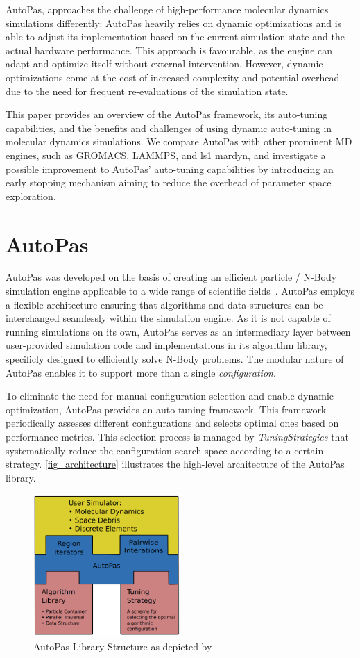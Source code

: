 \documentclass[conference]{IEEEtran}
\begin{document}
AutoPas, approaches the challenge of high-performance molecular dynamics simulations differently: AutoPas heavily relies on dynamic optimizations and is able to adjust its implementation based on the current simulation state and the actual hardware performance. This approach is favourable, as the engine can adapt and optimize itself without external intervention. However, dynamic optimizations come at the cost of increased complexity and potential overhead due to the need for frequent re-evaluations of the simulation state.

This paper provides an overview of the AutoPas framework, its auto-tuning capabilities, and the benefits and challenges of using dynamic auto-tuning in molecular dynamics simulations. We compare AutoPas with other prominent MD engines, such as GROMACS, LAMMPS, and ls1 mardyn, and investigate a possible improvement to AutoPas' auto-tuning capabilities by introducing an early stopping mechanism aiming to reduce the overhead of parameter space exploration.

\section{AutoPas}

AutoPas was developed on the basis of creating an efficient particle / N-Body simulation engine applicable to a wide range of scientific fields~\cite{Tchipev2020}. AutoPas employs a flexible architecture ensuring that algorithms and data structures can be interchanged seamlessly within the simulation engine. As it is not capable of running simulations on its own, AutoPas serves as an intermediary layer between user-provided simulation code and implementations in its algorithm library, specificly designed to efficiently solve N-Body problems. The modular nature of AutoPas enables it to support more than a single \textit{configuration}.

To eliminate the need for manual configuration selection and enable dynamic optimization, AutoPas provides an auto-tuning framework. This framework periodically assesses different configurations and selects optimal ones based on performance metrics. This selection process is managed by \textit{TuningStrategies} that systematically reduce the configuration search space according to a certain strategy. \autoref{fig_architecture} illustrates the high-level architecture of the AutoPas library.

\begin{figure}[H]
    \centering
    \includegraphics[width=2.2in]{figures/AutoPasLibraryStructure.png}
    \caption{AutoPas Library Structure as depicted by~\cite{Newcome2023Poster}}
    \label{fig_architecture}
\end{figure}
\end{document}
